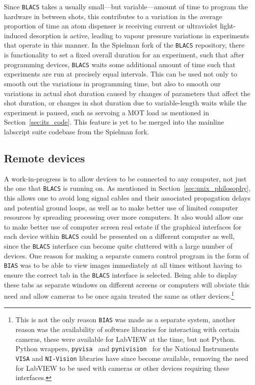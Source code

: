 Since \texttt{BLACS} takes a usually small---but variable---amount of time to program the hardware in between shots, this contributes to a variation in the average proportion of time an atom dispenser is receiving current or ultraviolet light-induced desorption is active, leading to vapour pressure variations in experiments that operate in this manner. In the Spielman fork of the \texttt{BLACS} repository, there is functionality to set a fixed overall duration for an experiment, such that after programming devices, \texttt{BLACS} waits some additional amount of time such that experiments are run at precisely equal intervals. This can be used not only to smooth out the variations in programming time, but also to smooth our variations in actual shot duration caused by changes of parameters that affect the shot duration, or changes in shot duration due to variable-length waits while the experiment is paused, such as servoing a MOT load as mentioned in Section~\ref{sec:its_code}. This feature is yet to be merged into the mainline labscript suite codebase from the Spielman fork.

\subsection{Remote devices}

A work-in-progress is to allow devices to be connected to any computer, not just the one that \texttt{BLACS} is running on. As mentioned in Section~\ref{sec:unix_philosophy}, this allows one to avoid long signal cables and their associated propagation delays and potential ground loops, as well as to make better use of limited computer resources by spreading processing over more computers. It also would allow one to make better use of computer screen real estate if the graphical interfaces for each device within \texttt{BLACS} could be presented on a different computer as well, since the \texttt{BLACS} interface can become quite cluttered with a large number of devices. One reason for making a separate camera control program in the form of \texttt{BIAS} was to be able to view images immediately at all times without having to ensure the correct tab in the \texttt{BLACS} interface is selected. Being able to display these tabs as separate windows on different screens or computers will obviate this need and allow cameras to be once again treated the same as other devices.\footnote{This is not the only reason \texttt{BIAS} was made as a separate system, another reason was the availability of software libraries for interacting with certain cameras, these were available for LabVIEW at the time, but not Python. Python wrappers, \texttt{pyvisa}~\cite{torsten_bronger_pyvisa_2018} and \texttt{pynivision}~\cite{peter_johnson_frc_team_294_pynivision_2015} for the National Instruments \texttt{VISA} and \texttt{NI-Vision} libraries have since become available, removing the need for LabVIEW to be used with cameras or other devices requiring these interfaces.}

